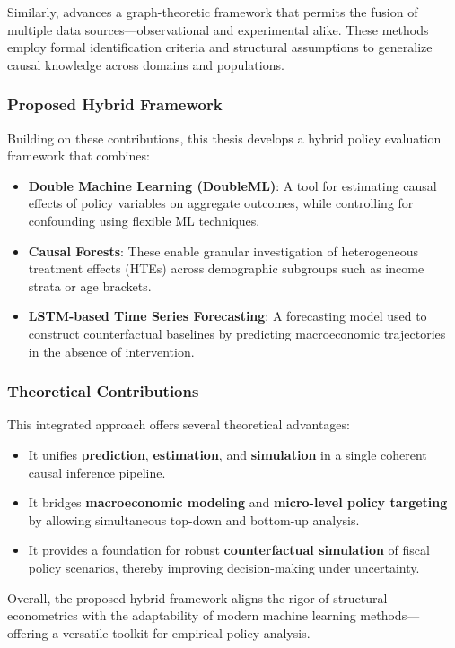 Similarly, \citet{bareinboim2023fusion} advances a graph-theoretic framework that permits the fusion of multiple data sources—observational and experimental alike. These methods employ formal identification criteria and structural assumptions to generalize causal knowledge across domains and populations.

\subsubsection{Proposed Hybrid Framework}\label{subsubsec:proposed}

Building on these contributions, this thesis develops a hybrid policy evaluation framework that combines:

\begin{itemize}
    \item \textbf{Double Machine Learning (DoubleML)}: A tool for estimating causal effects of policy variables on aggregate outcomes, while controlling for confounding using flexible ML techniques.
    \item \textbf{Causal Forests}: These enable granular investigation of heterogeneous treatment effects (HTEs) across demographic subgroups such as income strata or age brackets.
    \item \textbf{LSTM-based Time Series Forecasting}: A forecasting model used to construct counterfactual baselines by predicting macroeconomic trajectories in the absence of intervention.
\end{itemize}

\subsubsection{Theoretical Contributions}\label{subsubsec:theoretical}

This integrated approach offers several theoretical advantages:

\begin{itemize}
    \item It unifies \textbf{prediction}, \textbf{estimation}, and \textbf{simulation} in a single coherent causal inference pipeline.
    \item It bridges \textbf{macroeconomic modeling} and \textbf{micro-level policy targeting} by allowing simultaneous top-down and bottom-up analysis.
    \item It provides a foundation for robust \textbf{counterfactual simulation} of fiscal policy scenarios, thereby improving decision-making under uncertainty.
\end{itemize}

Overall, the proposed hybrid framework aligns the rigor of structural econometrics with the adaptability of modern machine learning methods—offering a versatile toolkit for empirical policy analysis.
